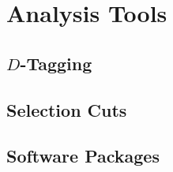 \chapter{Analysis Tools}
\label{ch_analysis}


\section{$D$-Tagging}
\label{sec_dtag}


\section{Selection Cuts}
\label{sec_cuts}


\section{Software Packages}
\label{sec_software}
